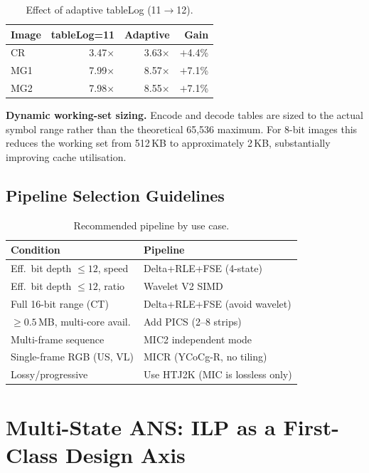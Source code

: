 \documentclass[journal]{IEEEtran}
\begin{document}
\begin{table}[htbp]
\centering
\caption{Effect of adaptive tableLog (11$\to$12).}
\label{tab:tablelog}
\begin{tabular}{lrrr}
\toprule
Image & tableLog=11 & Adaptive & Gain \\
\midrule
CR  & 3.47$\times$ & 3.63$\times$ & $+$4.4\% \\
MG1 & 7.99$\times$ & 8.57$\times$ & $+$7.1\% \\
MG2 & 7.98$\times$ & 8.55$\times$ & $+$7.1\% \\
\bottomrule
\end{tabular}
\end{table}

\textbf{Dynamic working-set sizing.} Encode and decode tables are sized to the
actual symbol range rather than the theoretical 65,536 maximum. For 8-bit images
this reduces the working set from 512\,KB to approximately 2\,KB, substantially
improving cache utilisation.

\subsection{Pipeline Selection Guidelines}

\begin{table}[htbp]
\centering
\caption{Recommended pipeline by use case.}
\label{tab:selection}
\begin{tabular}{p{3.5cm}p{3.8cm}}
\toprule
Condition & Pipeline \\
\midrule
Eff.\ bit depth $\leq 12$, speed & Delta+RLE+FSE (4-state) \\
Eff.\ bit depth $\leq 12$, ratio & Wavelet V2 SIMD \\
Full 16-bit range (CT) & Delta+RLE+FSE (avoid wavelet) \\
$\geq 0.5$\,MB, multi-core avail. & Add PICS (2--8 strips) \\
Multi-frame sequence & MIC2 independent mode \\
Single-frame RGB (US, VL) & MICR (YCoCg-R, no tiling) \\
Lossy/progressive & Use HTJ2K (MIC is lossless only) \\
\bottomrule
\end{tabular}
\end{table}

\section{Multi-State ANS: ILP as a First-Class Design Axis}
\label{sec:multistate}
\end{document}
